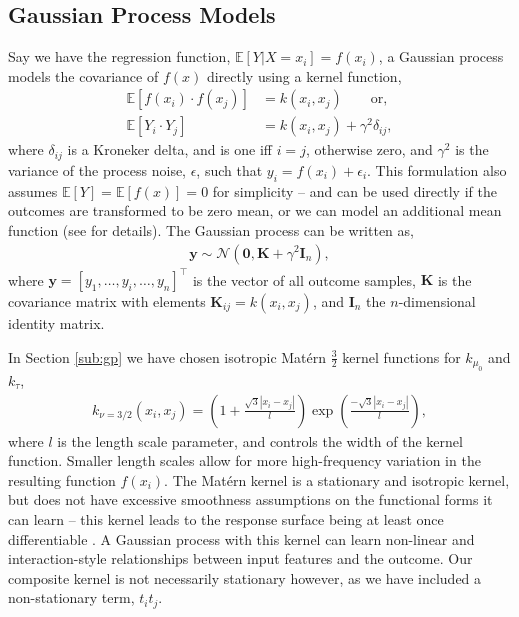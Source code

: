 \documentclass[12pt, a4paper]{article}
\begin{document}
\subsection{Gaussian Process Models}

Say we have the regression function, $\mathbb{E}[Y|X{=}x_i] = f(x_i)$, a
Gaussian process models the covariance of $f(x)$ directly using a kernel 
function,
\begin{align*}
  \mathbb{E}[f(x_i) \cdot f(x_j)] &= k(x_i, x_j) \qquad \textrm{or}, \\
  \mathbb{E}[Y_i \cdot Y_j] &= k(x_i, x_j) + \gamma^2 \delta_{ij},
\end{align*}
where $\delta_{ij}$ is a Kroneker delta, and is one iff $i=j$, otherwise zero,
and $\gamma^2$ is the variance of the process noise, $\epsilon$, such that $y_i
= f(x_i) + \epsilon_i$. This formulation also assumes $\mathbb{E}[Y] =
\mathbb{E}[f(x)] = 0$ for simplicity -- and can be used directly if the
outcomes are transformed to be zero mean, or we can model an additional mean
function (see \citet{williams2006} for details). The Gaussian process can be
written as,
\begin{align*}
  \mathbf{y} \sim \mathcal{N}(\mathbf{0}, \mathbf{K} + \gamma^2 \mathbf{I}_n),
\end{align*}
where $\mathbf{y} = [y_1, \ldots, y_i, \ldots, y_n]^\top$ is the vector of all
outcome samples, $\mathbf{K}$ is the covariance matrix with elements
$\mathbf{K}_{ij} = k(x_i, x_j)$, and $\mathbf{I}_n$ the $n$-dimensional
identity matrix. 

In Section \ref{sub:gp} we have chosen isotropic Mat\'{e}rn $\frac{3}{2}$
kernel functions for $k_{\mu_0}$ and $k_\tau$, 
\begin{align*}
  k_{\nu=3/2}(x_i, x_j) = 
    \left(1 + \frac{\sqrt{3}|x_i - x_j|}{l} \right)
    \exp\left(\frac{-\sqrt{3}|x_i - x_j|}{l}\right),
\end{align*}
where $l$ is the length scale parameter, and controls the width of the kernel
function. Smaller length scales allow for more high-frequency variation in the
resulting function $f(x_i)$. The Mat\'{e}rn kernel is a stationary and
isotropic kernel, but does not have excessive smoothness assumptions on the
functional forms it can learn -- this kernel leads to the response surface
being at least once differentiable \citep{williams2006}. A Gaussian process
with this kernel can learn non-linear and interaction-style relationships
between input features and the outcome. Our composite kernel is not
necessarily stationary however, as we have included a non-stationary term, $t_i
t_j$. 
\end{document}
